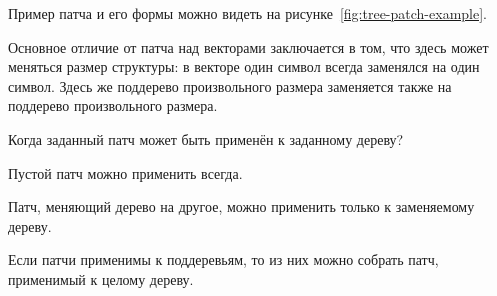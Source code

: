 Пример патча и его формы можно видеть на
рисунке~\ref{fig:tree-patch-example}.
    
Основное отличие от патча над векторами заключается в том, что здесь
может меняться размер структуры: в векторе один символ всегда
заменялся на один символ. Здесь же поддерево произвольного размера
заменяется также на поддерево произвольного размера.

Когда заданный патч может быть применён к заданному дереву?

\begin{code}%
\>  \AgdaSymbol{:}  \AgdaSymbol{\{} \AgdaSymbol{:} \AgdaSymbol{\}}        \<%
\end{code}

Пустой патч можно применить всегда.

\begin{code}%
\>[0]\<[2]%
\>[2] \AgdaSymbol{:} \AgdaSymbol{(} \AgdaSymbol{:} \AgdaSymbol{)}    \<%
\end{code}

Патч, меняющий дерево на другое, можно применить только к заменяемому
дереву.

\begin{code}%
\>[0]\<[2]%
\>[2] \AgdaSymbol{:} \AgdaSymbol{(}  \AgdaSymbol{:} \AgdaSymbol{)}        \<%
\end{code}

Если патчи применимы к поддеревьям, то из них можно собрать патч,
применимый к целому дереву.

\begin{code}%
\>[0]\<[2]%
\>[2] \AgdaSymbol{:} \AgdaSymbol{\{}  \AgdaSymbol{:} \AgdaSymbol{\}} \AgdaSymbol{\{} \AgdaSymbol{:}  \AgdaSymbol{\}} \AgdaSymbol{\{} \AgdaSymbol{:}  \AgdaSymbol{\}} \AgdaSymbol{\{}  \AgdaSymbol{:} \AgdaSymbol{\}}\<%
\\
\>[2]\<[4]%
\>[4]                 \<%
\end{code}

